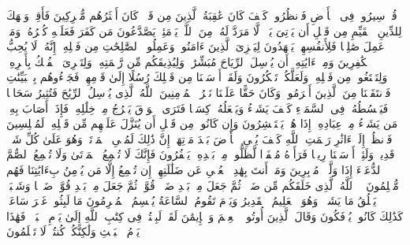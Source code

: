\startbuffer[\q:30:42]
قُلۡ سِیرُوا۟ فِی ٱلۡأَرۡضِ فَٱنظُرُوا۟ كَیۡفَ كَانَ عَٰقِبَةُ ٱلَّذِینَ مِن قَبۡلُۚ كَانَ أَكۡثَرُهُم مُّشۡرِكِینَ%
\stopbuffer
\startbuffer[\q:30:43]
فَأَقِمۡ وَجۡهَكَ لِلدِّینِ ٱلۡقَیِّمِ مِن قَبۡلِ أَن یَأۡتِیَ یَوۡمࣱ لَّا مَرَدَّ لَهُۥ مِنَ ٱللَّهِۖ یَوۡمَئِذࣲ یَصَّدَّعُونَ%
\stopbuffer
\startbuffer[\q:30:44]
مَن كَفَرَ فَعَلَیۡهِ كُفۡرُهُۥۖ وَمَنۡ عَمِلَ صَٰلِحࣰا فَلِأَنفُسِهِمۡ یَمۡهَدُونَ%
\stopbuffer
\startbuffer[\q:30:45]
لِیَجۡزِیَ ٱلَّذِینَ ءَامَنُوا۟ وَعَمِلُوا۟ ٱلصَّٰلِحَٰتِ مِن فَضۡلِهِۦۤۚ إِنَّهُۥ لَا یُحِبُّ ٱلۡكَٰفِرِینَ%
\stopbuffer
\startbuffer[\q:30:46]
وَمِنۡ ءَایَٰتِهِۦۤ أَن یُرۡسِلَ ٱلرِّیَاحَ مُبَشِّرَٰتࣲ وَلِیُذِیقَكُم مِّن رَّحۡمَتِهِۦ وَلِتَجۡرِیَ ٱلۡفُلۡكُ بِأَمۡرِهِۦ وَلِتَبۡتَغُوا۟ مِن فَضۡلِهِۦ وَلَعَلَّكُمۡ تَشۡكُرُونَ%
\stopbuffer
\startbuffer[\q:30:47]
وَلَقَدۡ أَرۡسَلۡنَا مِن قَبۡلِكَ رُسُلًا إِلَىٰ قَوۡمِهِمۡ فَجَاۤءُوهُم بِٱلۡبَیِّنَٰتِ فَٱنتَقَمۡنَا مِنَ ٱلَّذِینَ أَجۡرَمُوا۟ۖ وَكَانَ حَقًّا عَلَیۡنَا نَصۡرُ ٱلۡمُؤۡمِنِینَ%
\stopbuffer
\startbuffer[\q:30:48]
ٱللَّهُ ٱلَّذِی یُرۡسِلُ ٱلرِّیَٰحَ فَتُثِیرُ سَحَابࣰا فَیَبۡسُطُهُۥ فِی ٱلسَّمَاۤءِ كَیۡفَ یَشَاۤءُ وَیَجۡعَلُهُۥ كِسَفࣰا فَتَرَى ٱلۡوَدۡقَ یَخۡرُجُ مِنۡ خِلَٰلِهِۦۖ فَإِذَاۤ أَصَابَ بِهِۦ مَن یَشَاۤءُ مِنۡ عِبَادِهِۦۤ إِذَا هُمۡ یَسۡتَبۡشِرُونَ%
\stopbuffer
\startbuffer[\q:30:49]
وَإِن كَانُوا۟ مِن قَبۡلِ أَن یُنَزَّلَ عَلَیۡهِم مِّن قَبۡلِهِۦ لَمُبۡلِسِینَ%
\stopbuffer
\startbuffer[\q:30:50]
فَٱنظُرۡ إِلَىٰۤ ءَاثَٰرِ رَحۡمَتِ ٱللَّهِ كَیۡفَ یُحۡیِ ٱلۡأَرۡضَ بَعۡدَ مَوۡتِهَاۤۚ إِنَّ ذَٰلِكَ لَمُحۡیِ ٱلۡمَوۡتَىٰۖ وَهُوَ عَلَىٰ كُلِّ شَیۡءࣲ قَدِیرࣱ%
\stopbuffer
\startbuffer[\q:30:51]
وَلَئِنۡ أَرۡسَلۡنَا رِیحࣰا فَرَأَوۡهُ مُصۡفَرࣰّا لَّظَلُّوا۟ مِنۢ بَعۡدِهِۦ یَكۡفُرُونَ%
\stopbuffer
\startbuffer[\q:30:52]
فَإِنَّكَ لَا تُسۡمِعُ ٱلۡمَوۡتَىٰ وَلَا تُسۡمِعُ ٱلصُّمَّ ٱلدُّعَاۤءَ إِذَا وَلَّوۡا۟ مُدۡبِرِینَ%
\stopbuffer
\startbuffer[\q:30:53]
وَمَاۤ أَنتَ بِهَٰدِ ٱلۡعُمۡیِ عَن ضَلَٰلَتِهِمۡۖ إِن تُسۡمِعُ إِلَّا مَن یُؤۡمِنُ بِءَایَٰتِنَا فَهُم مُّسۡلِمُونَ%
\stopbuffer
\startbuffer[\q:30:54]
۞ ٱللَّهُ ٱلَّذِی خَلَقَكُم مِّن ضَعۡفࣲ ثُمَّ جَعَلَ مِنۢ بَعۡدِ ضَعۡفࣲ قُوَّةࣰ ثُمَّ جَعَلَ مِنۢ بَعۡدِ قُوَّةࣲ ضَعۡفࣰا وَشَیۡبَةࣰۚ یَخۡلُقُ مَا یَشَاۤءُۚ وَهُوَ ٱلۡعَلِیمُ ٱلۡقَدِیرُ%
\stopbuffer
\startbuffer[\q:30:55]
وَیَوۡمَ تَقُومُ ٱلسَّاعَةُ یُقۡسِمُ ٱلۡمُجۡرِمُونَ مَا لَبِثُوا۟ غَیۡرَ سَاعَةࣲۚ كَذَٰلِكَ كَانُوا۟ یُؤۡفَكُونَ%
\stopbuffer
\startbuffer[\q:30:56]
وَقَالَ ٱلَّذِینَ أُوتُوا۟ ٱلۡعِلۡمَ وَٱلۡإِیمَٰنَ لَقَدۡ لَبِثۡتُمۡ فِی كِتَٰبِ ٱللَّهِ إِلَىٰ یَوۡمِ ٱلۡبَعۡثِۖ فَهَٰذَا یَوۡمُ ٱلۡبَعۡثِ وَلَٰكِنَّكُمۡ كُنتُمۡ لَا تَعۡلَمُونَ%
\stopbuffer
